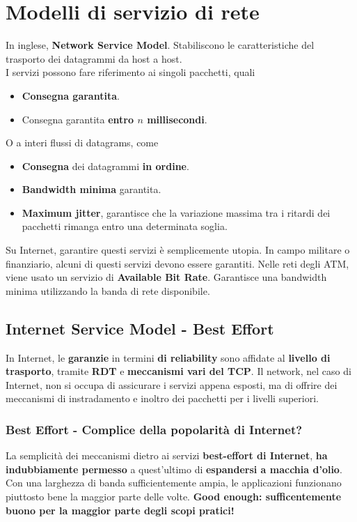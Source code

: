 \section{Modelli di servizio di rete}
In inglese, \textbf{Network Service Model}.
Stabiliscono le caratteristiche del trasporto dei datagrammi da host a host.\\
I servizi possono fare riferimento ai singoli pacchetti, quali
\begin{itemize}
	\item \textbf{Consegna garantita}.
	\item Consegna garantita \textbf{entro $n$ millisecondi}.
\end{itemize}
O a interi flussi di datagrams, come
\begin{itemize}
	\item \textbf{Consegna} dei datagrammi \textbf{in ordine}.
	\item \textbf{Bandwidth minima} garantita.
	\item \textbf{Maximum jitter}, garantisce che la variazione massima tra i ritardi dei pacchetti rimanga entro una determinata soglia.
\end{itemize}

Su Internet, garantire questi servizi è semplicemente utopia. In campo militare o finanziario, alcuni di questi servizi devono essere garantiti. Nelle reti degli ATM, viene usato un servizio di \textbf{Available Bit Rate}. Garantisce una bandwidth minima utilizzando la banda di rete disponibile.

\subsection{Internet Service Model - Best Effort}
In Internet, le \textbf{garanzie} in termini \textbf{di reliability} sono affidate al \textbf{livello di trasporto}, tramite \textbf{RDT} e \textbf{meccanismi vari del TCP}. Il network, nel caso di Internet, non si occupa di assicurare i servizi appena esposti, ma di offrire dei meccanismi di instradamento e inoltro dei pacchetti per i livelli superiori.

\subsubsection{Best Effort - Complice della popolarità di Internet?}
La semplicità dei meccanismi dietro ai servizi \textbf{best-effort di Internet}, \textbf{ha indubbiamente permesso} a quest'ultimo di \textbf{espandersi a macchia d'olio}.\\
Con una larghezza di banda sufficientemente ampia, le applicazioni funzionano piuttosto bene la maggior parte delle volte. \textbf{Good enough: sufficentemente buono per la maggior parte degli scopi pratici!}
